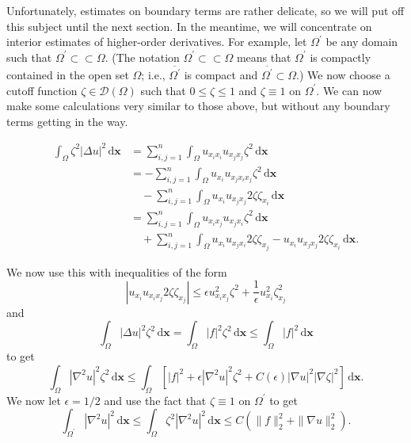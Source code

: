 Unfortunately, estimates on boundary terms are rather delicate, so we will put off this subject until the next section. In the meantime, we will concentrate on interior estimates of higher-order derivatives. For example, let $\Omega^{\prime}$ be any domain such that $\Omega^{\prime}\subset\subset\Omega$. (The notation $\Omega^{\prime}\subset\subset\Omega$ means that $\Omega^{\prime}$ is compactly contained in the open set $\Omega$; i.e., $\overline{\Omega^{\prime}}$ is compact and $\overline{\Omega^{\prime}}\subset\Omega$.) We now choose a cutoff function $\zeta\in\mathcal{D}(\Omega)$ such that $0\leq\zeta\leq1$ and $\zeta\equiv1$ on $\Omega^{\prime}$. We can now make some calculations very similar to those above, but without any boundary terms getting in the way.

\[\begin{aligned}
\int_\Omega\zeta^2|\Delta u|^2\,\mathrm{d}\bm{x}
&=\sum_{i,j=1}^n\int_\Omega u_{x_ix_i}u_{x_jx_j}\zeta^2\,\mathrm{d}\bm{x}\\
&=-\sum_{i,j=1}^n\int_\Omega u_{x_i}u_{x_jx_ix_j}\zeta^2\,\mathrm{d}\bm{x}\\
&\quad-\sum_{i,j=1}^n\int_\Omega u_{x_i}u_{x_jx_j}2\zeta\zeta_{x_i}\,\mathrm{d}\bm{x}\\
&=\sum_{i,j=1}^n\int_\Omega u_{x_ix_j}u_{x_jx_i}\zeta^2\,\mathrm{d}\bm{x}\\
&\quad+\sum_{i,j=1}^n\int_\Omega u_{x_i}u_{x_jx_i}2\zeta\zeta_{x_j}-u_{x_i}u_{x_jx_j}2\zeta\zeta_{x_i}\,\mathrm{d}\bm{x}.
\end{aligned}\]

We now use this with inequalities of the form
\begin{equation}\label{eq:interior-cutoff-young-product-bound}
|u_{x_i}u_{x_ix_j}2\zeta\zeta_{x_j}|\leq\epsilon u_{x_ix_j}^2\zeta^2+\frac{1}{\epsilon}u_{x_i}^2\zeta_{x_j}^2
\end{equation}
and
\begin{equation}\label{eq:interior-cutoff-weighted-data-bound}
\int_\Omega|\Delta u|^2\zeta^2\,\mathrm{d}\bm{x}=\int_\Omega|f|^2\zeta^2\,\mathrm{d}\bm{x}\leq\int_\Omega|f|^2\,\mathrm{d}\bm{x}
\end{equation}
to get
\begin{equation}\label{eq:interior-cutoff-preabsorption-hessian-bound}
\int_\Omega|\nabla^2u|^2\zeta^2\,\mathrm{d}\bm{x}\leq\int_\Omega[|f|^2+\epsilon|\nabla^2u|^2\zeta^2+C(\epsilon)|\nabla u|^2|\nabla\zeta|^2]\,\mathrm{d}\bm{x}.
\end{equation}
We now let $\epsilon=1/2$ and use the fact that $\zeta\equiv1$ on $\Omega^{\prime}$ to get
\begin{equation}\label{eq:interior-cutoff-local-hessian-apriori-estimate}
\int_{\Omega^{\prime}}|\nabla^2u|^2\,\mathrm{d}\bm{x}\leq\int_\Omega\zeta^2|\nabla^2u|^2\,\mathrm{d}\bm{x}\leq C\left(\|f\|_2^2+\|\nabla u\|_2^2\right).
\end{equation}


